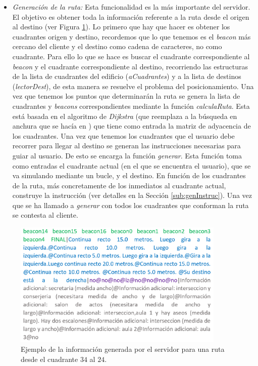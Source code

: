 \begin{itemize}
	  
	\item \textit{Generación de la ruta:} Esta funcionalidad es la más importante del servidor. El objetivo es obtener toda la información referente a la ruta desde el origen al destino (ver Figura \ref{fig:ejemplo_ruta}). Lo primero que hay que hacer es obtener los cuadrantes origen y destino, recordemos que lo que tenemos es el \textit{beacon} más cercano del cliente y el destino como cadena de caracteres, no como cuadrante. Para ello lo que se hace es buscar el cuadrante correspondiente al \textit{beacon} y el cuadrante correspondiente al destino, recorriendo las estructuras de la lista de cuadrantes del edificio (\textit{aCuadrantes}) y a la lista de destinos (\textit{lectorDest}), de esta manera se resuelve el problema del posicionamiento. Una vez que tenemos los puntos que determinarán la ruta se genera la lista de cuadrantes y \textit{beacons} correspondientes mediante la función \textit{calculaRuta}. Esta está basada en el algoritmo de \textit{Dijkstra} (que reemplaza a la búsqueda en anchura que se hacía en \cite{TFGguia}) que tiene como entrada la matriz de adyacencia de los cuadrantes. Una vez que tenemos los cuadrantes que el usuario debe recorrer para llegar al destino se generan las instrucciones necesarias para guiar al usuario. De esto se encarga la función \textit{generar}. Esta función toma como entradas el cuadrante actual (en el que se encuentra el usuario), que se va simulando mediante un bucle, y el destino. En función de los cuadrantes de la ruta, más concretamente de los inmediatos al cuadrante actual, construye la instrucción (ver detalles en la Sección \ref{sub:genInstruc}). Una vez que se ha llamado a \textit{generar} con todos los cuadrantes que conforman la ruta se contesta al cliente.
\end{itemize}


\begin{figure}[t]
	\centering
	\includegraphics[width=0.9\textwidth]{Imagenes/Capitulo4/ejemploRuta}
	\caption{Ejemplo de la información generada por el servidor para una ruta desde el cuadrante $34$ al $24$.}
	\label{fig:ejemplo_ruta}
\end{figure}


